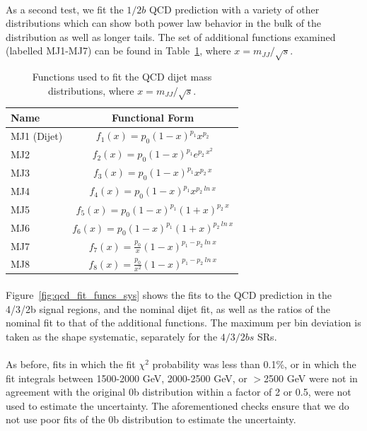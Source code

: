 \paragraph{}
As a second test, we fit the $1/2b$ QCD prediction with a variety of other distributions which can show both power law behavior in the bulk of the distribution as well as longer tails.  The set of additional functions examined (labelled MJ1-MJ7) can be found in Table~\ref{tab:fit_funcs}, where $x = m_{JJ} / \sqrt{s}$.

\begin{table}[htbp!]
\begin{center} 
\begin{tabular}{  l | c}
Name & Functional Form \\
\hline
MJ1 (Dijet) & $f_{1}(x) = p_0 (1-x)^{p_1} x^{p_2}$ \\
MJ2 & $f_{2}(x) = p_0 (1-x)^{p_1} e^{p_2\ x^2}$ \\
MJ3 & $f_{3}(x) = p_0 (1-x)^{p_1} x^{p_2\ x}$ \\
MJ4 & $f_{4}(x) = p_0 (1-x)^{p_1} x^{p_2\ ln\ x}$ \\
MJ5 & $f_{5}(x) = p_0 (1-x)^{p_1} (1+x)^{p_2\ x}$ \\
MJ6 & $f_{6}(x) = p_0 (1-x)^{p_1} (1+x)^{p_2\ ln\ x}$ \\
MJ7 & $f_{7}(x) = \frac{p_0}{x} (1-x)^{p_1 - p_2\ ln\ x}$ \\
MJ8 & $f_{8}(x) = \frac{p_0}{x^2} (1-x)^{p_1 - p_2\ ln\ x}$ \\
\hline
\end{tabular}
\caption{Functions used to fit the QCD dijet mass distributions, where $x = m_{JJ} / \sqrt{s}$.}
\label{tab:fit_funcs}
\end{center}
\end{table}

\paragraph{}
Figure~\ref{fig:qcd_fit_funcs_sys} shows the fits to the QCD prediction in the 4/3/2b  signal regions, and the nominal dijet fit, as well as the ratios of the nominal fit to that of the additional functions.  The maximum per bin deviation is taken as the shape systematic, separately for the $4/3/2bs$ SRs.

\paragraph{}
As before, fits in which the fit $\chi^2$ probability was less than 0.1\%,  or in which the fit integrals between 1500-2000 GeV, 2000-2500 GeV, or $>$2500 GeV were not in agreement with the original 0b distribution within a factor of 2 or 0.5, were not used to estimate the uncertainty.  The aforementioned checks ensure that we do not use poor fits of the 0b distribution to estimate the uncertainty.

